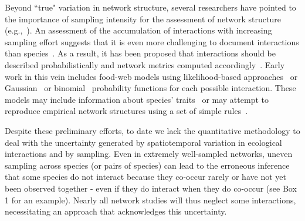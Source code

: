 \documentclass[12pt]{article}
\begin{document}
\begin{spacing}{2.0}
    Beyond ``true" variation in network structure, several researchers have pointed to the importance of sampling intensity for the assessment of network structure (e.g.,~\citealp{Martinez1999,Bluthgen2006,Bluthgen2007}). An assessment of the accumulation of interactions with increasing sampling effort suggests that it is even more challenging to document interactions than species~\citep{Poisot2012}. As a result, it has been proposed that interactions should be described probabilistically and network metrics computed accordingly~\citep{Poisot2016}. Early work in this vein includes food-web models using likelihood-based approaches~\citep{Allesina2008} or Gaussian~\citep{Williams2010} or binomial~\citep{Rohr2016} probability functions for each possible interaction. These models may include information about species' traits~\citep{Rohr2016} or may attempt to reproduce empirical network structures using a set of simple rules~\citep{Allesina2008,Williams2010}.

    Despite these preliminary efforts, to date we lack the quantitative methodology to deal with the uncertainty generated by spatiotemporal variation in ecological interactions and by sampling. Even in extremely well-sampled networks, uneven sampling across species (or pairs of species) can lead to the erroneous inference that some species do not interact because they co-occur rarely or have not yet been observed together - even if they do interact when they do co-occur (see Box 1 for an example). Nearly all network studies will thus neglect some interactions, necessitating an approach that acknowledges this uncertainty.



\end{spacing}
\end{document}
